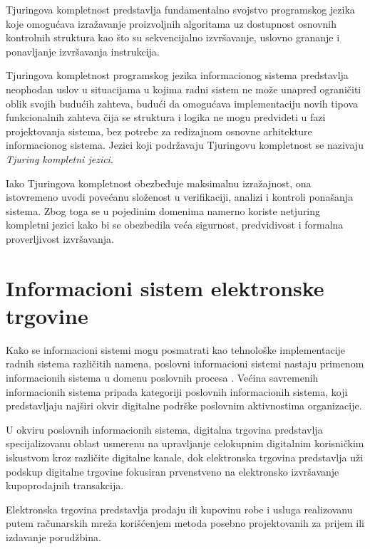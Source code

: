 \begin{definicija}
Tjuringova kompletnost \cite{turing1936computable} predstavlja fundamentalno svojstvo programskog jezika koje omogućava izražavanje proizvoljnih algoritama uz dostupnost osnovnih kontrolnih struktura kao što su sekvencijalno izvršavanje, uslovno grananje i ponavljanje izvršavanja instrukcija. 
\end{definicija}

Tjuringova kompletnost programskog jezika informacionog sistema predstavlja neophodan uslov u situacijama u kojima radni sistem ne može unapred ograničiti oblik svojih budućih zahteva, budući da omogućava implementaciju novih tipova funkcionalnih zahteva čija se struktura i logika ne mogu predvideti u fazi projektovanja sistema, bez potrebe za redizajnom osnovne arhitekture informacionog sistema. Jezici koji podržavaju Tjuringovu kompletnost se nazivaju \textit{Tjuring kompletni jezici}.

Iako Tjuringova kompletnost obezbeđuje maksimalnu izražajnost, ona istovremeno uvodi povećanu složenost u verifikaciji, analizi i kontroli ponašanja sistema. Zbog toga se u pojedinim domenima namerno koriste netjuring kompletni jezici kako bi se obezbedila veća sigurnost, predvidivost i formalna proverljivost izvršavanja.

\section{Informacioni sistem elektronske trgovine}
Kako se informacioni sistemi mogu posmatrati kao tehnološke implementacije radnih sistema različitih namena, poslovni informacioni sistemi nastaju primenom informacionih sistema u domenu poslovnih procesa \cite{bourgeois2019information}. Većina savremenih informacionih sistema pripada kategoriji poslovnih informacionih sistema, koji predstavljaju najširi okvir digitalne podrške poslovnim aktivnostima organizacije.

U okviru poslovnih informacionih sistema, digitalna trgovina  predstavlja specijalizovanu oblast usmerenu na upravljanje celokupnim digitalnim korisničkim iskustvom kroz različite digitalne kanale, dok elektronska trgovina  predstavlja uži podskup digitalne trgovine fokusiran prvenstveno na elektronsko izvršavanje kupoprodajnih transakcija.

\begin{definicija}
Elektronska trgovina \cite{oecd2025} predstavlja prodaju ili kupovinu robe i usluga realizovanu putem računarskih mreža korišćenjem metoda posebno projektovanih za prijem ili izdavanje porudžbina.
\end{definicija}

